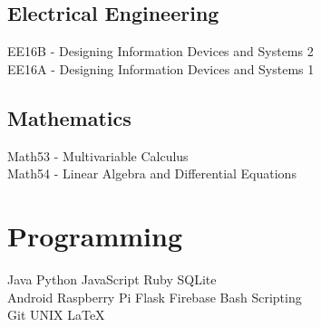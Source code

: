 \documentclass[]{format}
\begin{document}
\begin{minipage}[t]{0.33\textwidth}
\subsection{Electrical Engineering}
EE16B - Designing Information Devices and Systems 2 \\
EE16A - Designing Information Devices and Systems 1 \\

\subsection{Mathematics}
Math53 - Multivariable Calculus \\
Math54 - Linear Algebra and Differential Equations
\sectionsep


\section{Programming}
Java \textbullet{}   Python \textbullet{} JavaScript \textbullet{} Ruby \textbullet{}
SQLite \\
Android \textbullet{} Raspberry Pi \textbullet{} Flask \textbullet{} Firebase \textbullet{} Bash Scripting \\
Git \textbullet{} UNIX \textbullet{} LaTeX
\sectionsep

%
%

\end{minipage} 
\hfill
\end{document}
